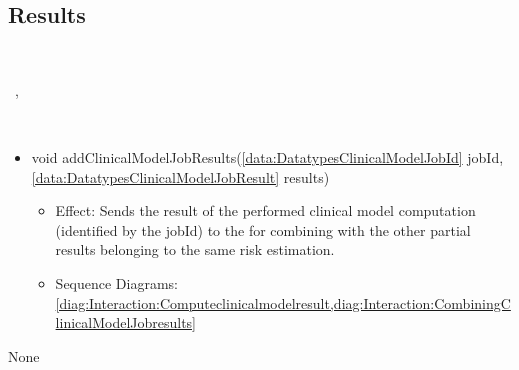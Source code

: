  \subsection{Results}\label{int:InterfacesResults}
    \begin{description}
      \item[Provided by:] \iconcomponent{}~
      \item[Required by:] \iconcomponent{}~, \iconcomponent{}~ 
      \item[Operations:] ~
    \begin{itemize}[noitemsep,nolistsep,leftmargin=-.25cm]
      \item \textsf{void addClinicalModelJobResults(\ref{data:DatatypesClinicalModelJobId} jobId, \ref{data:DatatypesClinicalModelJobResult} results)}
        \begin{itemize}[noitemsep,nolistsep]
           \item Effect: Sends the result of the performed clinical model computation (identified by the jobId) to the  for combining with the other partial results belonging to the same risk estimation. 
           \item Sequence Diagrams: \cref{diag:Interaction:Computeclinicalmodelresult,diag:Interaction:CombiningClinicalModelJobresults}
        \end{itemize}
    \end{itemize}
      \item[Diagrams:] None
    \end{description}

